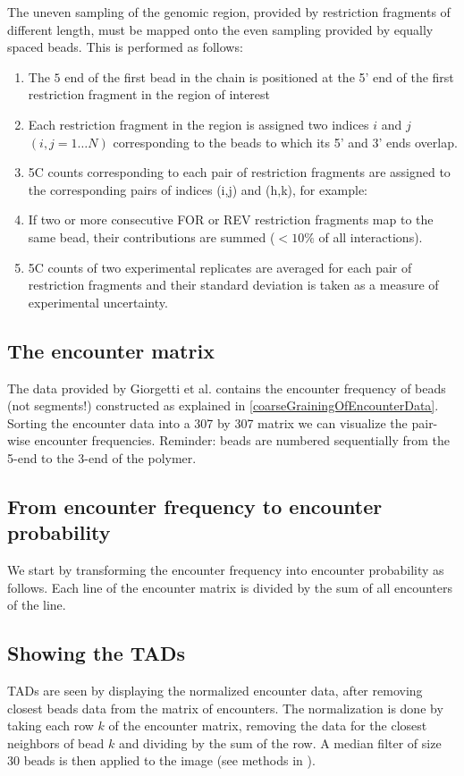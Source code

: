 \documentclass[12pt]{book}
\begin{document}
The uneven sampling of the genomic region, provided by restriction fragments of different length, must be mapped onto the even sampling provided by equally spaced beads. This is performed as follows\cite{giorgetti2014predictive}:
\begin{enumerate}
 \itemsep1pt  \parskip0pt 
\item The $5$ end of the first bead in the chain is positioned at the 5’ end of the first restriction fragment in the region of interest 
\item Each restriction fragment in the region is assigned two indices $i$ and $j$ $(i,j=1…N)$ corresponding to the beads to which its 5’ and 3’ ends overlap.
\item 5C counts corresponding to each pair of restriction fragments are assigned to the corresponding pairs of indices (i,j) and (h,k), for example:
\item If two or more consecutive FOR or REV restriction fragments map to the same bead, their contributions are summed ($<10\%$ of all interactions).
\item 5C counts of two experimental replicates are averaged for each pair of restriction fragments and their standard deviation is taken as a measure of experimental uncertainty.
\end{enumerate}

\subsection{The encounter matrix}\label{subsection_theEncounterMatrix}
The data provided by Giorgetti et al.\cite{giorgetti2014predictive} contains the encounter frequency of beads (not segments!) constructed as explained in \ref{coarseGrainingOfEncounterData}. Sorting the encounter data into a 307 by 307 matrix we can visualize the pair-wise encounter frequencies. Reminder: beads are numbered sequentially from the 5-end to the 3-end of the polymer.


\subsection{From encounter frequency to encounter probability} \label{subsection_fromEncounterFrequencyToEncounterProbability}
We start by transforming the encounter frequency into encounter probability as follows. Each line of the encounter matrix is divided by the sum of all encounters of the line.

\subsection{Showing the TADs}\label{subsection_showingTheTADs}
TADs are seen by displaying the normalized encounter data, after removing closest beads data from the matrix of encounters. 
The normalization is done by taking each row $k$ of the encounter matrix, removing the data for the closest neighbors of bead $k$ and dividing by the sum of the row. A median filter of size 30 beads is then applied to the image (see methods in \cite{nora2012spatial}). 
 
\end{document}
